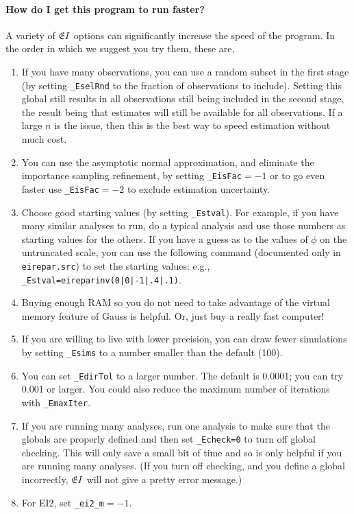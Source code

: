 \documentclass[11pt,titlepage]{article}
\newcommand{\EI}{\ensuremath{{\mathfrak EI}}}
\begin{document}
\paragraph{How do I get this program to run faster?}  A
variety of \EI\ options can significantly increase the speed of the
program.  In the order in which we suggest you try them, these are,
\begin{enumerate}
\item If you have many observations, you can use a random subset in
  the first stage (by setting \texttt{\_EselRnd} to the fraction of
  observations to include).  Setting this global still results in all
  observations still being included in the second stage, the result
  being that estimates will still be available for all observations.
  If a large $n$ is the issue, then this is the best way to speed
  estimation without much cost.
  
\item You can use the asymptotic normal approximation, and eliminate
  the importance sampling refinement, by setting
  \texttt{\_EisFac}$=-1$ or to go even faster use
  \texttt{\_EisFac}$=-2$ to exclude estimation uncertainty.

\item Choose good starting values (by setting \texttt{\_Estval}).  For
  example, if you have many similar analyses to run, do a typical
  analysis and use those numbers as starting values for the others.
  If you have a guess as to the values of $\phi$ on the untruncated
  scale, you can use the following command (documented only in
  \texttt{eirepar.src}) to set the starting values: e.g.,
  \texttt{\_Estval=eireparinv(0|0|-1|.4|.1)}.

\item Buying enough RAM so you do not need to take advantage of the
  virtual memory feature of Gauss is helpful.  Or, just buy a really
  fast computer!

\item If you are willing to live with lower precision, you can draw
  fewer simulations by setting \texttt{\_Esims} to a number smaller
  than the default (100).

\item You can set \texttt{\_EdirTol} to a larger number.  The default
  is 0.0001; you can try 0.001 or larger.  You could also reduce the
  maximum number of iterations with \texttt{\_EmaxIter}.

\item If you are running many analyses, run one analysis to make sure
  that the globals are properly defined and then set
  \texttt{\_Echeck=0} to turn off global checking.  This will only
  save a small bit of time and so is only helpful if you are running
  many analyses.  (If you turn off checking, and you define a global
  incorrectly, \EI\ will not give a pretty error message.)

\item For EI2, set \texttt{\_ei2\_m}$=-1$.
\end{enumerate}
\end{document}
